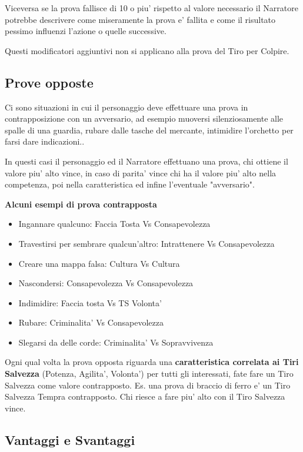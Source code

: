 \documentclass[a4paper,11pt,twoside,openany]{book}
\begin{document}
Viceversa se la prova fallisce di 10 o piu' rispetto al valore necessario il Narratore potrebbe descrivere come miseramente la prova e' fallita e come il risultato pessimo influenzi l'azione o quelle successive.

Questi modificatori aggiuntivi non si applicano alla prova del Tiro per Colpire.

\subsection{Prove opposte}

Ci sono situazioni in cui il personaggio deve effettuare una prova in contrapposizione con un avversario, ad esempio muoversi silenziosamente alle spalle di una guardia, rubare dalle tasche del mercante, intimidire l'orchetto per farsi dare indicazioni..

In questi casi il personaggio ed il Narratore effettuano una prova, chi ottiene il valore piu' alto vince, in caso di parita' vince chi ha il valore piu' alto nella competenza, poi nella caratteristica ed infine l'eventuale "avversario".

\bigskip

\textbf{Alcuni esempi di prova contrapposta}

\begin{itemize}
\item Ingannare qualcuno: Faccia Tosta Vs Consapevolezza
\item Travestirsi per sembrare qualcun'altro: Intrattenere Vs Consapevolezza
\item Creare una mappa falsa: Cultura Vs Cultura
\item Nascondersi: Consapevolezza Vs Consapevolezza
\item Indimidire: Faccia tosta Vs TS Volonta'
\item Rubare: Criminalita' Vs Consapevolezza
\item Slegarsi da delle corde: Criminalita' Vs Sopravvivenza
\end{itemize}

Ogni qual volta la prova opposta riguarda una \textbf{caratteristica correlata ai Tiri Salvezza} (Potenza, Agilita', Volonta') per tutti gli interessati, fate fare un Tiro Salvezza come valore contrapposto. Es. una prova di braccio di ferro e' un Tiro Salvezza Tempra contrapposto. Chi riesce a fare piu' alto con il Tiro Salvezza vince.

\bigskip

\subsection{Vantaggi e Svantaggi}
\end{document}

